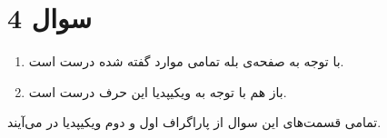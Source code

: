 \section*{سوال 4}
\begin{enumerate}
    \item با توجه به صفحه‌ی
    بله تمامی موارد گفته شده درست است.
    \item باز هم با توجه به ویکیپدیا این حرف درست است.
\end{enumerate}
تمامی قسمت‌های این سوال از پاراگراف اول و دوم ویکیپدیا در می‌آیند.